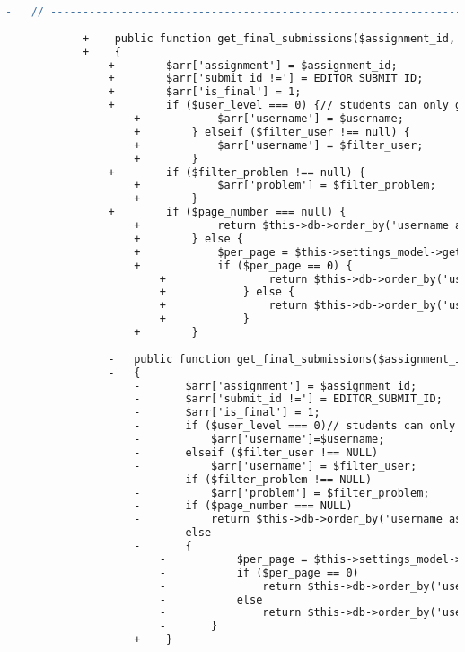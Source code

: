 \begin{lstlisting}[language=diff, caption=Perubahan pada kode Submit\_model.php]
			-	// ------------------------------------------------------------------------
			
			+    public function get_final_submissions($assignment_id, $user_level, $username, $page_number = null, $filter_user = null, $filter_problem = null)
			+    {
				+        $arr['assignment'] = $assignment_id;
				+        $arr['submit_id !='] = EDITOR_SUBMIT_ID;
				+        $arr['is_final'] = 1;
				+        if ($user_level === 0) {// students can only get final submissions of themselves
					+            $arr['username'] = $username;
					+        } elseif ($filter_user !== null) {
					+            $arr['username'] = $filter_user;
					+        }
				+        if ($filter_problem !== null) {
					+            $arr['problem'] = $filter_problem;
					+        }
				+        if ($page_number === null) {
					+            return $this->db->order_by('username asc, problem asc')->get_where('submissions', $arr)->result_array();
					+        } else {
					+            $per_page = $this->settings_model->get_setting('results_per_page_final');
					+            if ($per_page == 0) {
						+                return $this->db->order_by('username asc, problem asc')->get_where('submissions', $arr)->result_array();
						+            } else {
						+                return $this->db->order_by('username asc, problem asc')->limit($per_page, ($page_number - 1) * $per_page)->get_where('submissions', $arr)->result_array();
						+            }
					+        }
				
				-	public function get_final_submissions($assignment_id, $user_level, $username, $page_number = NULL, $filter_user = NULL, $filter_problem = NULL)
				-	{
					-		$arr['assignment'] = $assignment_id;
					-		$arr['submit_id !='] = EDITOR_SUBMIT_ID;
					-		$arr['is_final'] = 1;
					-		if ($user_level === 0)// students can only get final submissions of themselves
					-			$arr['username']=$username;
					-		elseif ($filter_user !== NULL)
					-			$arr['username'] = $filter_user;
					-		if ($filter_problem !== NULL)
					-			$arr['problem'] = $filter_problem;
					-		if ($page_number === NULL)
					-			return $this->db->order_by('username asc, problem asc')->get_where('submissions', $arr)->result_array();
					-		else
					-		{
						-			$per_page = $this->settings_model->get_setting('results_per_page_final');
						-			if ($per_page == 0)
						-				return $this->db->order_by('username asc, problem asc')->get_where('submissions', $arr)->result_array();
						-			else
						-				return $this->db->order_by('username asc, problem asc')->limit($per_page,($page_number-1)*$per_page)->get_where('submissions', $arr)->result_array();
						-		}
					+    }
				

\end{lstlisting}
